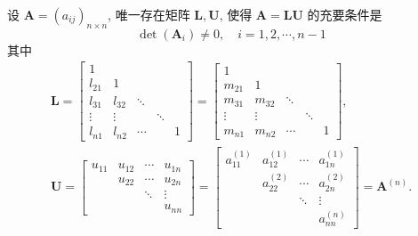 \begin{tcolorbox}[breakable,title=定理]
     设 $ \boldsymbol{A}=\left(a_{i j}\right)_{n \times n} $, 唯一存在矩阵 $ \boldsymbol{L}, \boldsymbol{U} $, 使得 $ \boldsymbol{A}=\boldsymbol{L U} $ 的充要条件是
$$ \operatorname{det}\left(\boldsymbol{A}_{i}\right) \neq 0, \quad i=1,2, \cdots, n-1 $$
其中
$$
\begin{array}{l}
\boldsymbol{L}=\left[\begin{array}{ccccc}
1 & & & & \\
l_{21} & 1 & & & \\
l_{31} & l_{32} & \ddots & & \\
\vdots & \vdots & & \ddots & \\
l_{n 1} & l_{n 2} & \cdots & & 1
\end{array}\right]=\left[\begin{array}{ccccc}
1 & & & & \\
m_{21} & 1 & & & \\
m_{31} & m_{32} & \ddots & & \\
\vdots & \vdots & & \ddots & \\
m_{n 1} & m_{n 2} & \cdots & & 1
\end{array}\right] \text {, } \\
\boldsymbol{U}=\left[\begin{array}{cccc}
u_{11} & u_{12} & \cdots & u_{1 n} \\
& u_{22} & \cdots & u_{2 n} \\
& & \ddots & \vdots \\
& & & u_{n n}
\end{array}\right]=\left[\begin{array}{cccc}
a_{11}^{(1)} & a_{12}^{(1)} & \cdots & a_{1 n}^{(1)} \\
& a_{22}^{(2)} & \cdots & a_{2 n}^{(2)} \\
& & \ddots & \vdots \\
& & & a_{n n}^{(n)}
\end{array}\right]=\boldsymbol{A}^{(n)} . \\
\end{array}
$$
\end{tcolorbox}


